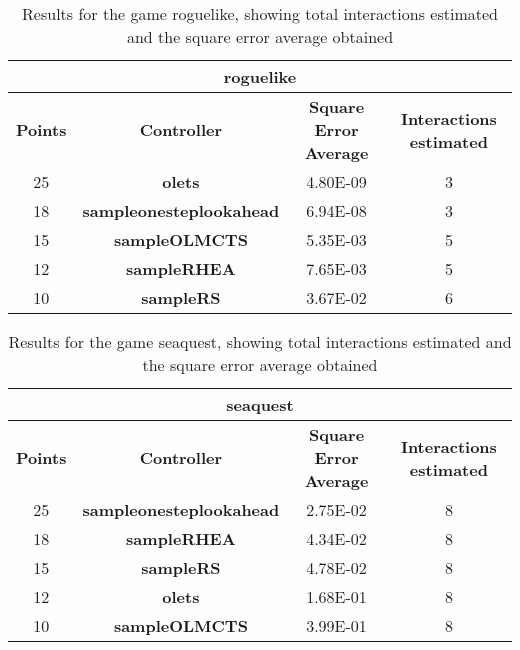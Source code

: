 \begin{table*}[!t]
\begin{center}
\begin{adjustbox}{width=1\textwidth}
\begin{tabular}{|c|c|c|c|}
\hline
\multicolumn{4}{|c|}{\textbf{roguelike}}\\
\hline
\textbf{Points} & \textbf{Controller} & \textbf{Square Error Average} & \textbf{Interactions estimated}\\
\hline
25 & \textbf{olets} & 4.80E-09 & 3
 \\
\hline
18 & \textbf{sampleonesteplookahead} & 6.94E-08 & 3
 \\
\hline
15 & \textbf{sampleOLMCTS} & 5.35E-03 & 5
 \\
\hline
12 & \textbf{sampleRHEA} & 7.65E-03 & 5
 \\
\hline
10 & \textbf{sampleRS} & 3.67E-02 & 6
 \\
\hline
\end{tabular}
\end{adjustbox}
\caption{Results for the game roguelike, showing total interactions estimated and the square error average obtained}
\label{tab:weights}
\end{center}
\end{table*}
\begin{table*}[!t]
\begin{center}
\begin{adjustbox}{width=1\textwidth}
\begin{tabular}{|c|c|c|c|}
\hline
\multicolumn{4}{|c|}{\textbf{seaquest}}\\
\hline
\textbf{Points} & \textbf{Controller} & \textbf{Square Error Average} & \textbf{Interactions estimated}\\
\hline
25 & \textbf{sampleonesteplookahead} & 2.75E-02 & 8
 \\
\hline
18 & \textbf{sampleRHEA} & 4.34E-02 & 8
 \\
\hline
15 & \textbf{sampleRS} & 4.78E-02 & 8
 \\
\hline
12 & \textbf{olets} & 1.68E-01 & 8
 \\
\hline
10 & \textbf{sampleOLMCTS} & 3.99E-01 & 8
 \\
\hline
\end{tabular}
\end{adjustbox}
\caption{Results for the game seaquest, showing total interactions estimated and the square error average obtained}
\label{tab:weights}
\end{center}
\end{table*}
